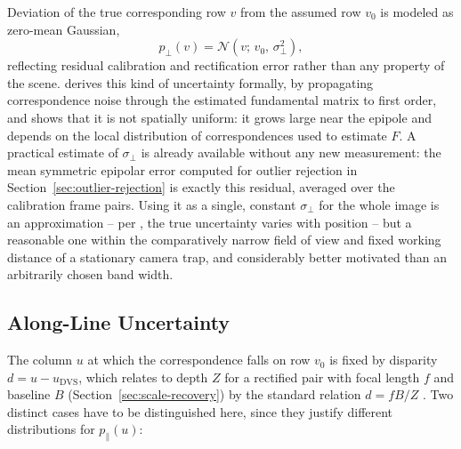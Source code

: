 Deviation of the true corresponding row $v$ from the assumed row $v_0$ is
modeled as zero-mean Gaussian,
\begin{equation}
    p_\perp(v) = \mathcal{N}\left(v;\, v_0,\, \sigma_\perp^2\right),
\end{equation}
reflecting residual calibration and rectification error rather than any
property of the scene. \textcite{zhang_determining_1998} derives this kind
of uncertainty formally, by propagating correspondence noise through the
estimated fundamental matrix to first order, and shows that it is not
spatially uniform: it grows large near the epipole and depends on the local
distribution of correspondences used to estimate $F$. A practical estimate
of $\sigma_\perp$ is already available without any new measurement: the mean
symmetric epipolar error computed for outlier rejection in
Section~\ref{sec:outlier-rejection} \parencite{fathy2011} is exactly this
residual, averaged over the calibration frame pairs. Using it as a single,
constant $\sigma_\perp$ for the whole image is an approximation -- per
\textcite{zhang_determining_1998}, the true uncertainty varies with position
-- but a reasonable one within the comparatively narrow field of view and
fixed working distance of a stationary camera trap, and considerably better
motivated than an arbitrarily chosen band width.

\subsection{Along-Line Uncertainty}
\label{sec:zone-along-line}

The column $u$ at which the correspondence falls on row $v_0$ is fixed by
disparity $d = u - u_{\text{DVS}}$, which relates to depth $Z$ for a
rectified pair with focal length $f$ and baseline $B$
(Section~\ref{sec:scale-recovery}) by the standard relation
$d = fB/Z$ \parencite{hartley_multiple_2003}. Two distinct cases have to be
distinguished here, since they justify different distributions for
$p_\parallel(u)$:


